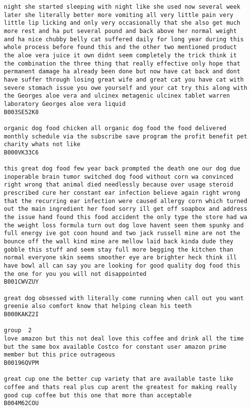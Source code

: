 \documentclass[11pt]{article}
\begin{document}
\begin{Verbatim}[commandchars=\\\{\}]
night she started sleeping with night like she used now several week later she literally better more vomiting all very little pain very little lip licking and only very occasionally that she also get much more rest and ha put several pound and back above her normal weight and ha nice chubby belly cat suffered daily for long year during this whole process before found this and the other two mentioned product the aloe vera juice it own didnt seem completely the trick think it the combination the three thing that really effective only hope that permanent damage ha already been done but now have cat back and dont have suffer through losing great wife and great cat you have cat with severe stomach issue you owe yourself and your cat try this along with the Georges aloe vera and ulcinex metagenic ulcinex tablet warren laboratory Georges aloe vera liquid
B003SE52K8

organic dog food chicken all organic dog food the food delivered monthly schedule via the subscribe save program the profit benefit pet charity whats not like
B000VK33C6

this great dog food few year back prompted the death one our dog due inoperable brain tumor switched dog food without corn wa convinced right wrong that animal died needlessly because over usage steroid prescribed cure her constant ear infection believe again right wrong that the recurring ear infection were caused allergy corn which turned out the main ingredient her food sorry ill get off soapbox and address the issue hand found this food accident the only type the store had wa the weight loss formula turn out dog love havent seen them spunky and full energy ive got coon hound and two jack russell mine are not the bounce off the wall kind mine are mellow laid back kinda dude they gobble this stuff and seem stay full more begging the kitchen than normal everyone skin seems smoother eye are brighter heck think ill have bowl all can say you are looking for good quality dog food this the one for you you will not disappointed
B001CWVZUY

great dog obsessed with literally come running when call out you want greenie also comfort know that helping clean his teeth
B000KAKZ2I

group  2
love amazon but this not deal love this coffee and drink all the time but the same box available Costco for constant user amazon prime member but this price outrageous
B00196QVPM

great cup one the better cup variety that are available taste like coffee and thats real plus cup arent the greatest for making really good cup coffee but this one that more than acceptable
B004M62COU


\end{Verbatim}
\end{document}
